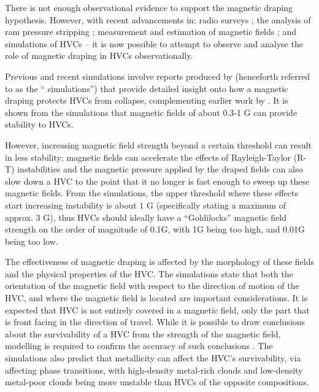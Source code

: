 There is not enough observational evidence to support the magnetic draping hypothesis. However, with recent advancements in: radio surveys \citep{ID52, ID71, ID1, ID3, ID6, ID18, ID43, ID44, ID45}; the analysis of ram pressure stripping \citep{ID11, ID23, ID33}; measurement and estimation of magnetic fields \citep{ID5, ID23, ID30, ID11, ID26, ID21}; and simulations of HVCs \citep{ID13, ID23, ID24, ID33, ID34} – it is now possible to attempt to observe and analyse the role of magnetic draping in HVCs observationally.


Previous and recent simulations involve reports produced by \cite{ID23, ID24, ID33} (henceforth referred to as the “\citeauthor{ID23} simulations”) that provide detailed insight onto how a magnetic draping protects HVCs from collapse, complementing earlier work by \cite{ID13, ID11}. It is shown from the \citeauthor{ID23} simulations that magnetic fields of about 0.3-1 {\textmu}G can provide stability to HVCs.


However, increasing magnetic field strength beyond a certain threshold can result in less stability; magnetic fields can accelerate the effects of Rayleigh-Taylor (R-T) instabilities and the magnetic pressure applied by the draped fields can also slow down a HVC to the point that it no longer is fast enough to sweep up these magnetic fields. From the \citeauthor{ID23} simulations, the upper threshold where these effects start increasing instability is about 1 {\textmu}G (specifically stating a maximum of approx. 3 {\textmu}G), thus HVCs should ideally have a “Goldilocks” magnetic field strength on the order of magnitude of 0.1{\textmu}G, with 1{\textmu}G being too high, and 0.01{\textmu}G being too low.


The effectiveness of magnetic draping is affected by the morphology of these fields and the physical properties of the HVC. The \citeauthor{ID23} simulations state that both the orientation of the magnetic field with respect to the direction of motion of the HVC, and where the magnetic field is located are important considerations. It is expected that HVC is not entirely covered in a magnetic field, only the part that is front facing in the direction of travel. While it is possible to draw conclusions about the survivability of a HVC from the strength of the magnetic field, modelling is required to confirm the accuracy of such conclusions \citep{ID5}. The \citeauthor{ID23} simulations also predict that metallicity can affect the HVC's survivability, via affecting phase transitions, with high-density metal-rich clouds and low-density metal-poor clouds being more unstable than HVCs of the opposite compositions.


